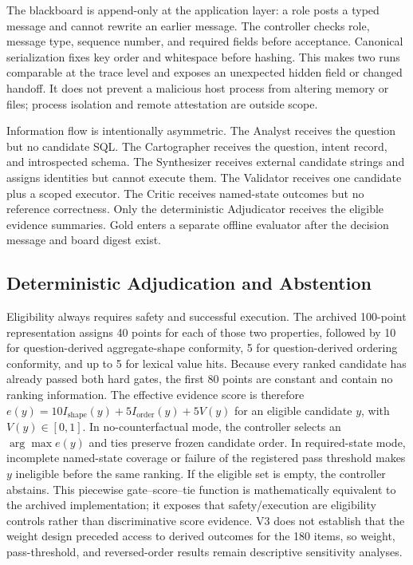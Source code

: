 \documentclass[applsci,article,submit,moreauthors]{Definitions/mdpi}
\begin{document}
The blackboard is append-only at the application layer: a role posts a typed message and cannot rewrite an earlier message. The controller checks role, message type, sequence number, and required fields before acceptance. Canonical serialization fixes key order and whitespace before hashing. This makes two runs comparable at the trace level and exposes an unexpected hidden field or changed handoff. It does not prevent a malicious host process from altering memory or files; process isolation and remote attestation are outside scope.

Information flow is intentionally asymmetric. The Analyst receives the question but no candidate SQL. The Cartographer receives the question, intent record, and introspected schema. The Synthesizer receives external candidate strings and assigns identities but cannot execute them. The Validator receives one candidate plus a scoped executor. The Critic receives named-state outcomes but no reference correctness. Only the deterministic Adjudicator receives the eligible evidence summaries. Gold enters a separate offline evaluator after the decision message and board digest exist.

\subsection{Deterministic Adjudication and Abstention}

Eligibility always requires safety and successful execution. The archived 100-point representation assigns 40 points for each of those two properties, followed by 10 for question-derived aggregate-shape conformity, 5 for question-derived ordering conformity, and up to 5 for lexical value hits. Because every ranked candidate has already passed both hard gates, the first 80 points are constant and contain no ranking information. The effective evidence score is therefore $e(y)=10I_{\mathrm{shape}}(y)+5I_{\mathrm{order}}(y)+5V(y)$ for an eligible candidate $y$, with $V(y)\in[0,1]$. In no-counterfactual mode, the controller selects an $\arg\max e(y)$ and ties preserve frozen candidate order. In required-state mode, incomplete named-state coverage or failure of the registered pass threshold makes $y$ ineligible before the same ranking. If the eligible set is empty, the controller abstains. This piecewise gate--score--tie function is mathematically equivalent to the archived implementation; it exposes that safety/execution are eligibility controls rather than discriminative score evidence. V3 does not establish that the weight design preceded access to derived outcomes for the 180 items, so weight, pass-threshold, and reversed-order results remain descriptive sensitivity analyses.
\end{document}
